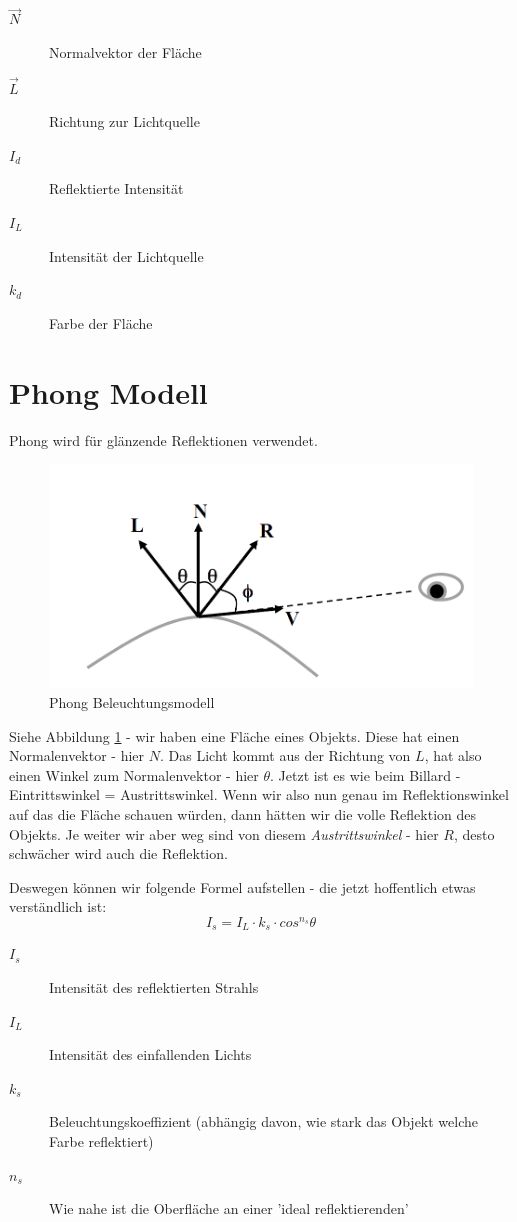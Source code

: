 \begin{description}
	\item[\(\vec{N}\)] Normalvektor der Fläche
	\item[\(\vec{L}\)] Richtung zur Lichtquelle
	\item[\(I_d\)] Reflektierte Intensität
	\item[\(I_L\)] Intensität der Lichtquelle
	\item[\(k_d\)] Farbe der Fläche
\end{description}

\section{Phong Modell}
Phong wird für glänzende Reflektionen verwendet. 
\begin{figure}[!ht]
	\centering
	\includegraphics[width=0.4\linewidth]{fig/phong}
	\caption{Phong Beleuchtungsmodell}
	\label{fig:phong}
\end{figure}
Siehe Abbildung \ref{fig:phong} - wir haben eine Fläche eines Objekts. Diese hat einen Normalenvektor - hier \(N\). Das Licht kommt aus der Richtung von \(L\), hat also einen Winkel zum Normalenvektor - hier \(\theta\). Jetzt ist es wie beim Billard - Eintrittswinkel = Austrittswinkel. Wenn wir also nun genau im Reflektionswinkel auf das die Fläche schauen würden, dann hätten wir die volle Reflektion des Objekts. Je weiter wir aber weg sind von diesem \textit{Austrittswinkel} - hier \(R\), desto schwächer wird auch die Reflektion. 

Deswegen können wir folgende Formel aufstellen - die jetzt hoffentlich etwas verständlich ist:
\begin{displaymath}
I_s = I_L\cdot k_s\cdot cos^{n_s}\theta
\end{displaymath}

\begin{description}
	\item[\(I_s\)] Intensität des reflektierten Strahls
	\item[\(I_L\)] Intensität des einfallenden Lichts
	\item[\(k_s\)] Beleuchtungskoeffizient (abhängig davon, wie stark das Objekt welche Farbe reflektiert)
	\item[\(n_s\)] Wie nahe ist die Oberfläche an einer 'ideal reflektierenden'
\end{description}

